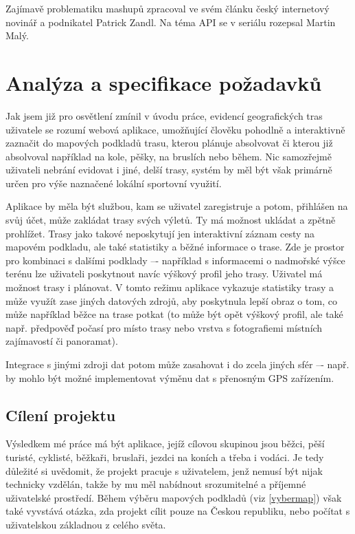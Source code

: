 Zajímavě problematiku mashupů zpracoval ve svém článku
\cite{certodejMashup} český internetový novinář a podnikatel Patrick
Zandl. Na téma API se v seriálu \cite{misantropApi} rozepsal Martin
Malý.

\chapter{Analýza a specifikace požadavků}

Jak jsem již pro osvětlení zmínil v úvodu práce, evidencí
geografických tras uživatele se rozumí webová aplikace, umožňující
člověku pohodlně a interaktivně zaznačit do mapových podkladů trasu,
kterou plánuje absolvovat či kterou již absolvoval například na kole,
pěšky, na bruslích nebo během. Nic samozřejmě uživateli nebrání
evidovat i jiné, delší trasy, systém by měl být však primárně určen
pro výše naznačené lokální sportovní využití.

Aplikace by měla být službou, kam se uživatel zaregistruje a potom,
přihlášen na svůj účet, může zakládat trasy svých výletů. Ty má
možnost ukládat a zpětně prohlížet. Trasy jako takové neposkytují jen
interaktivní záznam cesty na mapovém podkladu, ale také statistiky a
běžné informace o trase. Zde je prostor pro kombinaci s dalšími
podklady –- například s informacemi o nadmořské výšce terénu lze
uživateli poskytnout navíc výškový profil jeho trasy. Uživatel má
možnost trasy i plánovat. V tomto režimu aplikace vykazuje statistiky
trasy a může využít zase jiných datových zdrojů, aby poskytnula lepší
obraz o tom, co může například běžce na trase potkat (to může být
opět výškový profil, ale také např. předpověď počasí pro místo trasy
nebo vrstva s fotografiemi místních zajímavostí či panoramat).

Integrace s jinými zdroji dat potom může zasahovat i do zcela jiných
sfér –- např. by mohlo být možné implementovat výměnu dat s přenosným
GPS zařízením.

\section{Cílení projektu}
Výsledkem mé práce má být aplikace, jejíž cílovou skupinou jsou
běžci, pěší turisté, cyklisté, běžkaři, bruslaři, jezdci na koních a
třeba i vodáci. Je tedy důležité si uvědomit, že projekt pracuje s
uživatelem, jenž nemusí být nijak technicky vzdělán, takže by mu měl
nabídnout srozumitelné a příjemné uživatelské prostředí. Během výběru
mapových podkladů (viz \ref{vybermap}) však také vyvstává otázka, zda
projekt cílit pouze na Českou republiku, nebo počítat s uživatelskou
základnou z celého světa.

